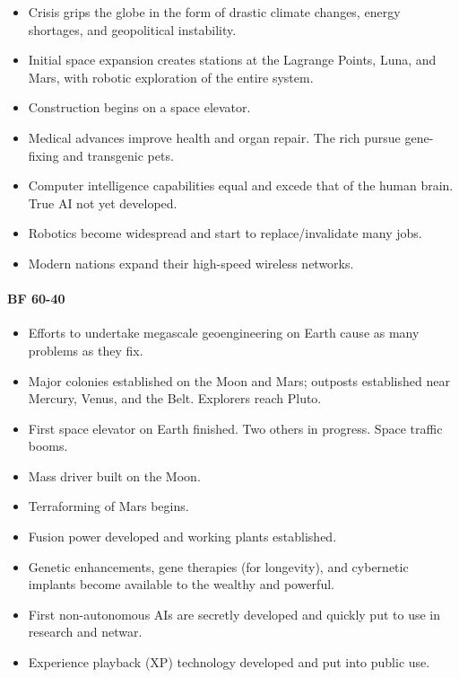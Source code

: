 \begin{itemize}
\item Crisis grips the globe in the form of drastic climate changes,
  energy shortages, and geopolitical instability.
\item Initial space expansion creates stations at the Lagrange Points,
  Luna, and Mars, with robotic exploration of the entire system.
\item Construction begins on a space elevator.
\item Medical advances improve health and organ repair. The rich
  pursue gene-fixing and transgenic pets.
\item Computer intelligence capabilities equal and excede that of the
  human brain. True AI not yet developed.
\item Robotics become widespread and start to replace/invalidate many
  jobs.
\item Modern nations expand their high-speed wireless networks.
\end{itemize}

\paragraph{ BF 60-40}

\begin{itemize}
\item Efforts to undertake megascale geoengineering on Earth cause as
  many problems as they fix.
\item Major colonies established on the Moon and Mars; outposts
  established near Mercury, Venus, and the Belt.  Explorers reach
  Pluto.
\item First space elevator on Earth finished. Two others in
  progress. Space traffic booms.
\item Mass driver built on the Moon.
\item Terraforming of Mars begins.
\item Fusion power developed and working plants established.
\item Genetic enhancements, gene therapies (for longevity), and
  cybernetic implants become available to the wealthy and powerful.
\item First non-autonomous AIs are secretly developed and quickly put
  to use in research and netwar.
\item Experience playback (XP) technology developed and put into
  public use.
\end{itemize}

